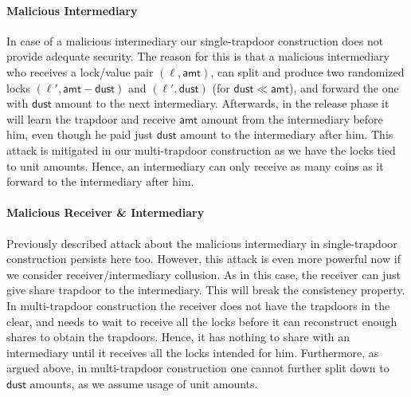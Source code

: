 \paragraph{Malicious Intermediary} In case of a malicious intermediary our single-trapdoor 
construction does not provide adequate security. The reason for this is that a malicious 
intermediary who receives a lock/value pair $(\ell, \mathsf{amt})$, can split and produce 
two randomized locks $(\ell', \mathsf{amt}-\mathsf{dust})$ and $(\ell', \mathsf{dust})$ 
(for $\mathsf{dust} \ll \mathsf{amt}$), and forward the one with $\mathsf{dust}$ amount to 
the next intermediary. Afterwards, in the release phase it will learn the trapdoor and receive 
$\mathsf{amt}$ amount from the intermediary before him, even though he paid just $\mathsf{dust}$ 
amount to the intermediary after him. This attack is mitigated in our multi-trapdoor 
construction as we have the locks tied to unit amounts. Hence, an intermediary can only 
receive as many coins as it forward to the intermediary after him.


\paragraph{Malicious Receiver \& Intermediary} Previously described attack about the malicious 
intermediary in single-trapdoor construction persists here too. However, this attack is even 
more powerful now if we consider receiver/intermediary collusion. As in this case, the receiver 
can just give share trapdoor to the intermediary. This will break the consistency property. 
In multi-trapdoor construction the receiver does not have the trapdoors in the clear, and needs 
to wait to receive all the locks before it can reconstruct enough shares to obtain the trapdoors. 
Hence, it has nothing to share with an intermediary until it receives all the locks intended for 
him. Furthermore, as argued above, in multi-trapdoor construction one cannot further split down 
to $\mathsf{dust}$ amounts, as we assume usage of unit amounts.

